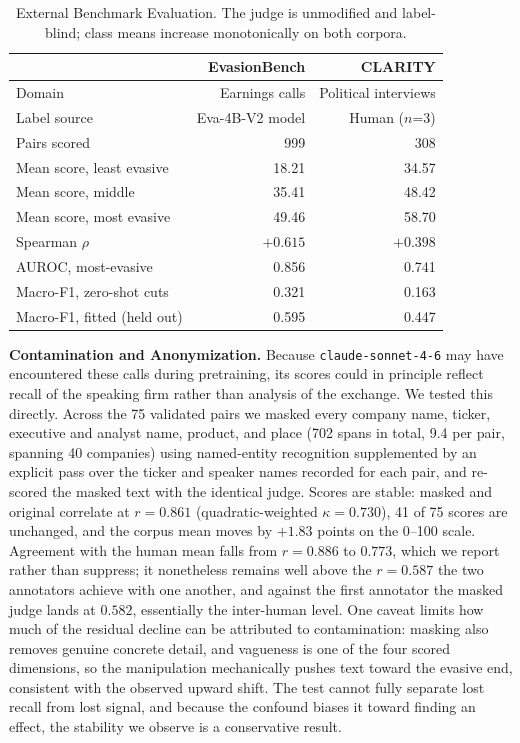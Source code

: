 \documentclass[conference]{IEEEtran}
\begin{document}
\begin{table}[t]
\centering
\caption{External Benchmark Evaluation. The judge is unmodified and label-blind; class means increase monotonically on both corpora.}
\label{tab:external}
\begin{tabular}{lrr}
\toprule
 & EvasionBench & CLARITY \\
\midrule
Domain & Earnings calls & Political interviews \\
Label source & Eva-4B-V2 model & Human ($n$=3) \\
Pairs scored & 999 & 308 \\
\midrule
Mean score, least evasive & 18.21 & 34.57 \\
Mean score, middle & 35.41 & 48.42 \\
Mean score, most evasive & 49.46 & 58.70 \\
\midrule
Spearman $\rho$ & $+0.615$ & $+0.398$ \\
AUROC, most-evasive & 0.856 & 0.741 \\
Macro-F1, zero-shot cuts & 0.321 & 0.163 \\
Macro-F1, fitted (held out) & 0.595 & 0.447 \\
\bottomrule
\end{tabular}
\end{table}

\textbf{Contamination and Anonymization.} Because \texttt{claude-sonnet-4-6} may have encountered these calls during pretraining, its scores could in principle reflect recall of the speaking firm rather than analysis of the exchange. We tested this directly. Across the 75 validated pairs we masked every company name, ticker, executive and analyst name, product, and place (702 spans in total, 9.4 per pair, spanning 40 companies) using named-entity recognition supplemented by an explicit pass over the ticker and speaker names recorded for each pair, and re-scored the masked text with the identical judge. Scores are stable: masked and original correlate at $r = 0.861$ (quadratic-weighted $\kappa = 0.730$), 41 of 75 scores are unchanged, and the corpus mean moves by $+1.83$ points on the 0--100 scale. Agreement with the human mean falls from $r = 0.886$ to $0.773$, which we report rather than suppress; it nonetheless remains well above the $r = 0.587$ the two annotators achieve with one another, and against the first annotator the masked judge lands at $0.582$, essentially the inter-human level. One caveat limits how much of the residual decline can be attributed to contamination: masking also removes genuine concrete detail, and vagueness is one of the four scored dimensions, so the manipulation mechanically pushes text toward the evasive end, consistent with the observed upward shift. The test cannot fully separate lost recall from lost signal, and because the confound biases it toward finding an effect, the stability we observe is a conservative result.
\end{document}
